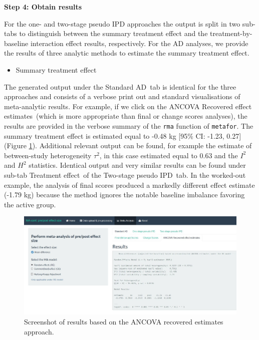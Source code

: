 \documentclass[AMA,STIX1COL]{WileyNJD-v2}
\begin{document}
\vspace{0.1cm}

\textbf{Step 4: Obtain results}
\vspace{0.1cm}

For the one- and two-stage pseudo IPD approaches the output is split in two sub-tabs to distinguish between the summary treatment effect and the treatment-by-baseline interaction effect results, respectively. For the AD analyses, we provide the results of three analytic methods to estimate the summary treatment effect.

\begin{itemize}
\item Summary treatment effect
\end{itemize}
The generated output under the \textquotesingle Standard AD\textquotesingle\ tab is identical for the three approaches and consists of a verbose print out and standard visualisations of meta-analytic results. For example, if we click on the \textquotesingle ANCOVA Recovered effect estimates\textquotesingle\ (which is more appropriate than final or change scores analyses), the results are provided in the verbose summary of the \texttt{rma} function of \texttt{metafor}. The summary treatment effect is estimated equal to -0.48 kg [95\% CI: -1.23, 0.27] (Figure \ref{fig:shiny-ancova_res}). Additional relevant output can be found, for example the estimate of between-study heterogeneity $\tau^2$, in this case estimated equal to 0.63 and the $I^2$ and $H^2$ statistics. Identical output and very similar results can be found under sub-tab \textquotesingle Treatment effect\textquotesingle\ of the \textquotesingle Two-stage pseudo IPD\textquotesingle\ tab. In the worked-out example, the analysis of final scores produced a markedly different effect estimate (-1.79 kg) because the method ignores the notable baseline imbalance favoring the active group.


\begin{figure}[t]
  \centering \includegraphics[width=1.0\textwidth]{ANCOVA_res.JPG}
    \caption{\small {Screenshot of results based on the ANCOVA recovered estimates approach.}} \label{fig:shiny-ancova_res}
\end{figure}
\end{document}
